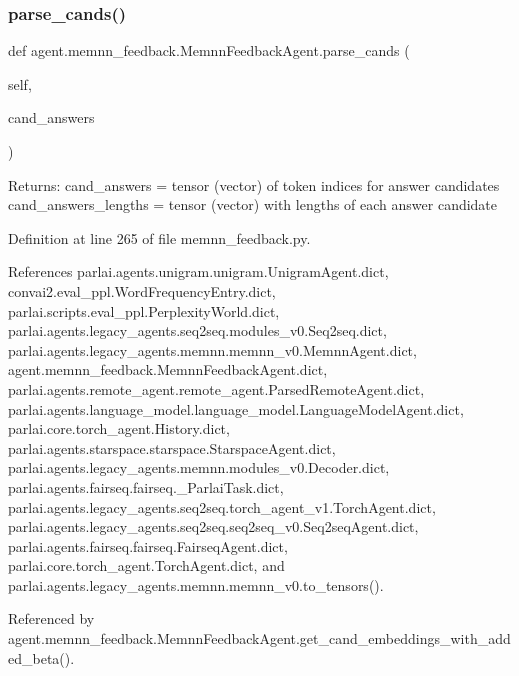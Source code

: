 \subsubsection{\texorpdfstring{parse\+\_\+cands()}{parse\_cands()}}
{\footnotesize\ttfamily def agent.\+memnn\+\_\+feedback.\+Memnn\+Feedback\+Agent.\+parse\+\_\+cands (\begin{DoxyParamCaption}\item[{}]{self,  }\item[{}]{cand\+\_\+answers }\end{DoxyParamCaption})}

\begin{DoxyVerb}Returns:
    cand_answers = tensor (vector) of token indices for answer candidates
    cand_answers_lengths = tensor (vector) with lengths of each answer candidate
\end{DoxyVerb}
 

Definition at line 265 of file memnn\+\_\+feedback.\+py.



References parlai.\+agents.\+unigram.\+unigram.\+Unigram\+Agent.\+dict, convai2.\+eval\+\_\+ppl.\+Word\+Frequency\+Entry.\+dict, parlai.\+scripts.\+eval\+\_\+ppl.\+Perplexity\+World.\+dict, parlai.\+agents.\+legacy\+\_\+agents.\+seq2seq.\+modules\+\_\+v0.\+Seq2seq.\+dict, parlai.\+agents.\+legacy\+\_\+agents.\+memnn.\+memnn\+\_\+v0.\+Memnn\+Agent.\+dict, agent.\+memnn\+\_\+feedback.\+Memnn\+Feedback\+Agent.\+dict, parlai.\+agents.\+remote\+\_\+agent.\+remote\+\_\+agent.\+Parsed\+Remote\+Agent.\+dict, parlai.\+agents.\+language\+\_\+model.\+language\+\_\+model.\+Language\+Model\+Agent.\+dict, parlai.\+core.\+torch\+\_\+agent.\+History.\+dict, parlai.\+agents.\+starspace.\+starspace.\+Starspace\+Agent.\+dict, parlai.\+agents.\+legacy\+\_\+agents.\+memnn.\+modules\+\_\+v0.\+Decoder.\+dict, parlai.\+agents.\+fairseq.\+fairseq.\+\_\+\+Parlai\+Task.\+dict, parlai.\+agents.\+legacy\+\_\+agents.\+seq2seq.\+torch\+\_\+agent\+\_\+v1.\+Torch\+Agent.\+dict, parlai.\+agents.\+legacy\+\_\+agents.\+seq2seq.\+seq2seq\+\_\+v0.\+Seq2seq\+Agent.\+dict, parlai.\+agents.\+fairseq.\+fairseq.\+Fairseq\+Agent.\+dict, parlai.\+core.\+torch\+\_\+agent.\+Torch\+Agent.\+dict, and parlai.\+agents.\+legacy\+\_\+agents.\+memnn.\+memnn\+\_\+v0.\+to\+\_\+tensors().



Referenced by agent.\+memnn\+\_\+feedback.\+Memnn\+Feedback\+Agent.\+get\+\_\+cand\+\_\+embeddings\+\_\+with\+\_\+added\+\_\+beta().

